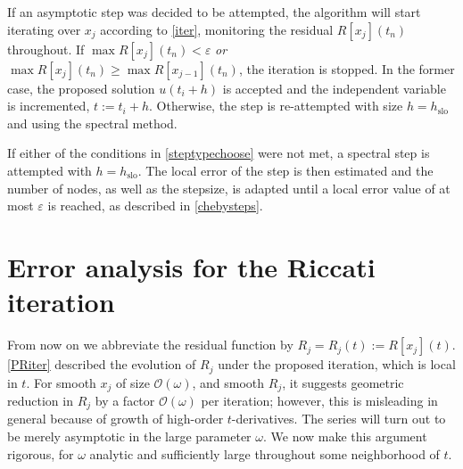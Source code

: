\documentclass[10pt]{article}
\newcommand{\bigO}{{\mathcal O}}
\newcommand{\om}{\omega}
\begin{document}
If an asymptotic step was decided to be attempted, the algorithm will start
iterating over $x_j$ according to \cref{iter}, monitoring the residual
$R[x_j](t_n)$ throughout. If $\max R[x_j](t_n) < \varepsilon$ \emph{or} $\max
R[x_j](t_n) \geq \max R[x_{j-1}](t_n)$, the iteration is stopped. In the former
case, the proposed solution $u(t_i+h)$ is accepted and the independent variable
is incremented, $t := t_i + h$. Otherwise, the step is re-attempted with size
$h = h_{\text{slo}}$ and using the spectral method. 

If either of the conditions in \cref{steptypechoose} were not met, a spectral
step is attempted with $h = h_{\text{slo}}$. The local error of the step is
then estimated and the number of nodes, as well as the stepsize, is
adapted until a local error value of at most $\varepsilon$ is reached, as described in
\cref{chebysteps}.


\section{Error analysis for the Riccati iteration\label{errorana}}

From now on we abbreviate the residual function by $R_j = R_j(t) := R[x_j](t)$.
\cref{PRiter} described the evolution of $R_j$
under the proposed iteration, which is local in $t$.
For smooth $x_j$ of size $\bigO(\om)$, and smooth $R_j$,
it suggests geometric reduction in $R_j$ by a factor $\bigO(\om)$ per iteration;
however, this is misleading in general because of
growth of high-order $t$-derivatives.
The series will turn out to be merely asymptotic in the large parameter $\om$.
We now make this argument rigorous, for $\om$ analytic
and sufficiently large throughout some neighborhood of $t$.

\end{document}
